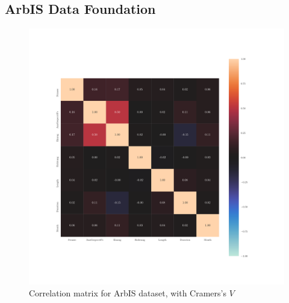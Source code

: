 \documentclass[a4paper,headsepline,footsepline,fontsize=11pt,BCOR=12mm,DIV=12]{report}
\newcommand{\nocontentsline}[3]{}
\newcommand{\tocless}[2]{\bgroup\let\addcontentsline=\nocontentsline#1{#2}\egroup}
\begin{document}
\begin{appendices}
\tocless\section{ArbIS Data Foundation}
\label{appendix_arbis_dataset}



\begin{figure}[h]
	\centering
	\includegraphics[scale=0.8]{../CorrAnalysis/data/ArbIS/01_dataset/plots/arbis_dataset_corr_cramers}
	\caption{Correlation matrix for ArbIS dataset, with Cramers's $V$}
	\label{img:appendix_correlation_matrix_dataset_theils}
\end{figure}
\begin{figure}[h]
	\centering

\end{figure}
\end{appendices}
\end{document}
